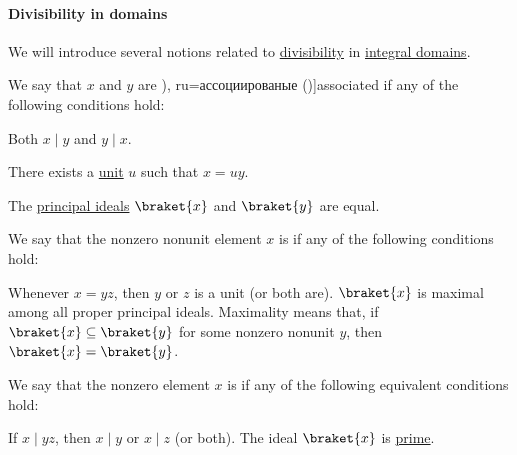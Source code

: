 \paragraph{Divisibility in domains}

\begin{definition}\label{def:domain_divisibility}
  We will introduce several notions related to \hyperref[def:divisibility]{divisibility} in \hyperref[def:integral_domain]{integral domains}.

  \begin{thmenum}
     We say that \( x \) and \( y \) are \term[bg=ассоциирани (\cite[142]{ГеновМиховскиМоллов1991}), ru=ассоциированые (\cite[118]{Винберг2014})]{associated} if any of the following conditions hold:
    \begin{thmenum}
       Both \( x \mid y \) and \( y \mid x \).

       There exists a \hyperref[def:divisibility/unit]{unit} \( u \) such that \( x = uy \).

       The \hyperref[def:semiring_ideal/principal]{principal ideals} \( \braket{ x } \) and \( \braket{ y } \) are equal.
    \end{thmenum}

     We say that the nonzero nonunit element \( x \) is  if any of the following conditions hold:
    \begin{thmenum}
       Whenever \( x = yz \), then \( y \) or \( z \) is a unit (or both are).
       \( \braket{ x } \) is maximal among all proper principal ideals. Maximality means that, if \( \braket{ x } \subseteq \braket{ y } \) for some nonzero nonunit \( y \), then \( \braket{ x } = \braket{ y } \).
    \end{thmenum}

     We say that the nonzero element \( x \) is  if any of the following equivalent conditions hold:
    \begin{thmenum}
       If \( x \mid yz \), then \( x \mid y \) or \( x \mid z \) (or both).
       The ideal \( \braket{ x } \) is \hyperref[def:semiring_ideal/prime]{prime}.
    \end{thmenum}


\end{thmenum}
\end{definition}
